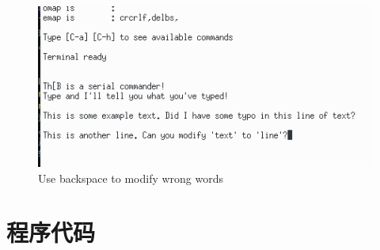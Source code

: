 \documentclass[a4paper]{ctexart}
\begin{document}
\begin{figure}[h]
  \centering\includegraphics{./img/pgedit.png}
  \caption{Use backspace to modify wrong words}\label{pgedit}
\end{figure}


\section{程序代码}
\end{document}
